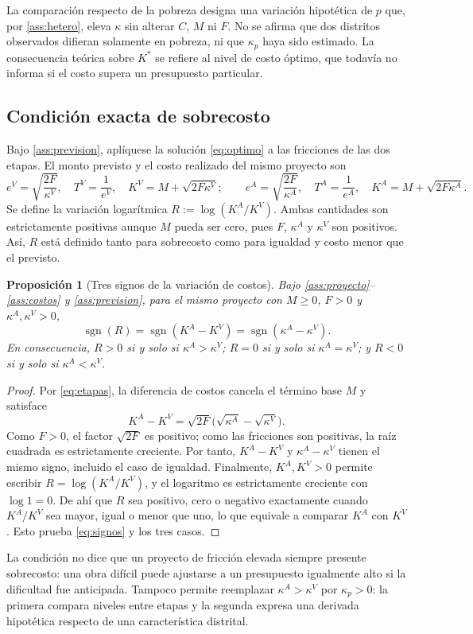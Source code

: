 \documentclass[11pt]{article}
\newtheorem{proposition}{Proposición}
\newcommand{\KA}{K^{A}}
\newcommand{\KV}{K^{V}}
\newcommand{\kA}{\kappa^{A}}
\newcommand{\kV}{\kappa^{V}}
\begin{document}
La comparación respecto de la pobreza designa una variación hipotética de $p$ que, por \ref{ass:hetero}, eleva $\kappa$ sin alterar $C$, $M$ ni $F$. No se afirma que dos distritos observados difieran solamente en pobreza, ni que $\kappa_p$ haya sido estimado. La consecuencia teórica sobre $K^*$ se refiere al nivel de costo óptimo, que todavía no informa si el costo supera un presupuesto particular.

\subsection{Condición exacta de sobrecosto}
Bajo \ref{ass:prevision}, aplíquese la solución \eqref{eq:optimo} a las fricciones de las dos etapas. El monto previsto y el costo realizado del mismo proyecto son
\begin{equation}\label{eq:etapas}
 e^V=\sqrt{\frac{2F}{\kV}},\quad T^V=\frac1{e^V},\quad
 \KV=M+\sqrt{2F\kV};\qquad
 e^A=\sqrt{\frac{2F}{\kA}},\quad T^A=\frac1{e^A},\quad
 \KA=M+\sqrt{2F\kA}.
\end{equation}
Se define la variación logarítmica $R:=\log(\KA/\KV)$. Ambas cantidades son estrictamente positivas aunque $M$ pueda ser cero, pues $F$, $\kA$ y $\kV$ son positivos. Así, $R$ está definido tanto para sobrecosto como para igualdad y costo menor que el previsto.
\begin{proposition}[Tres signos de la variación de costos]\label{prop:dos}
Bajo \ref{ass:proyecto}--\ref{ass:costos} y \ref{ass:prevision}, para el mismo proyecto con $M\geq0$, $F>0$ y $\kA,\kV>0$,
\begin{equation}\label{eq:signos}
 \operatorname{sgn}(R)=\operatorname{sgn}(\KA-\KV)
 =\operatorname{sgn}(\kA-\kV).
\end{equation}
En consecuencia, $R>0$ si y solo si $\kA>\kV$; $R=0$ si y solo si $\kA=\kV$; y $R<0$ si y solo si $\kA<\kV$.
\end{proposition}
\begin{proof}
Por \eqref{eq:etapas}, la diferencia de costos cancela el término base $M$ y satisface
\begin{equation}\label{eq:resta}
 \KA-\KV=\sqrt{2F}\bigl(\sqrt{\kA}-\sqrt{\kV}\bigr).
\end{equation}
Como $F>0$, el factor $\sqrt{2F}$ es positivo; como las fricciones son positivas, la raíz cuadrada es estrictamente creciente. Por tanto, $\KA-\KV$ y $\kA-\kV$ tienen el mismo signo, incluido el caso de igualdad. Finalmente, $\KA,\KV>0$ permite escribir $R=\log(\KA/\KV)$, y el logaritmo es estrictamente creciente con $\log 1=0$. De ahí que $R$ sea positivo, cero o negativo exactamente cuando $\KA/\KV$ sea mayor, igual o menor que uno, lo que equivale a comparar $\KA$ con $\KV$. Esto prueba \eqref{eq:signos} y los tres casos.
\end{proof}
La condición no dice que un proyecto de fricción elevada siempre presente sobrecosto: una obra difícil puede ajustarse a un presupuesto igualmente alto si la dificultad fue anticipada. Tampoco permite reemplazar $\kA>\kV$ por $\kappa_p>0$: la primera compara niveles entre etapas y la segunda expresa una derivada hipotética respecto de una característica distrital.
\end{document}
